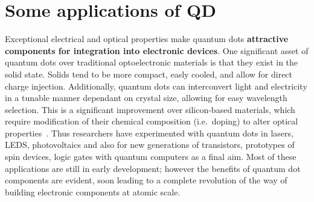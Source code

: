 \section{Some applications of QD}
\label{sec:applications}

Exceptional electrical and optical properties make quantum dots \textbf{attractive components for integration into electronic devices}. One significant asset of quantum dots over traditional optoelectronic materials is that they exist in the solid state. Solids tend to be more compact, easly cooled, and allow for direct charge injection. Additionally, quantum dots can interconvert light and electricity in a tunable manner dependant on crystal size, allowing for easy wavelength selection. This is a significant improvement over silicon-based materials, which require modification of their chemical composition (i.e.\ doping) to alter optical properties~\cite{Weisbuch2000}. Thus researchers have experimented with quantum dots in lasers, LEDS, photovoltaics and also for new generations of transistors, prototypes of spin devices, logic gates with quantum computers as a final aim. Most of these applications are still in early development; however the benefits of quantum dot components are evident, soon leading to a complete revolution of the way of building electronic components at atomic scale.

% 

